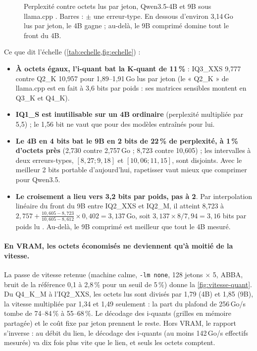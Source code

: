 \begin{figure}[ht]
\centering
\GrapheEchelle
\caption[Perplexité contre octets lus par jeton, Qwen3.5 4B et 9B]{Perplexité contre octets lus par jeton, Qwen3.5-4B et 9B sous llama.cpp \mes. Barres : $\pm$ une erreur-type. En dessous d'environ 3,14\,Go lus par jeton, le 4B gagne ; au-delà, le 9B comprimé domine tout le front du 4B.}
\label{fig:echelle}
\end{figure}

Ce que dit l'échelle (\cref{tab:echelle,fig:echelle}) :
\begin{itemize}
\item \textbf{À octets égaux, l'i-quant bat la K-quant de 11\,\%} : IQ3\_XXS 9,777 contre Q2\_K 10,957 pour 1,89--1,91\,Go lus par jeton (le « Q2\_K » de llama.cpp est en fait à 3,6 bits par poids : ses matrices sensibles montent en Q3\_K et Q4\_K).
\item \textbf{IQ1\_S est inutilisable sur un 4B ordinaire} (perplexité multipliée par 5,5) ; le 1,56 bit ne vaut que pour des modèles entraînés pour lui.
\item \textbf{Le 4B en 4 bits bat le 9B en 2 bits de 22\,\% de perplexité, à 1\,\% d'octets près} (2,730 contre 2,757\,Go ; 8,723 contre 10,605) ; les intervalles à deux erreurs-types, $[8{,}27 ; 9{,}18]$ et $[10{,}06 ; 11{,}15]$, sont disjoints. Avec le meilleur 2 bits portable d'aujourd'hui, rapetisser vaut mieux que comprimer pour Qwen3.5.
\item \textbf{Le croisement a lieu vers 3,2 bits par poids, pas à 2}. Par interpolation linéaire du front du 9B entre IQ2\_XXS et IQ2\_M, il atteint 8,723 à $2{,}757 + \frac{10{,}605 - 8{,}723}{10{,}605 - 8{,}612} \times 0{,}402 = 3{,}137$\,Go, soit $3{,}137 \times 8 / 7{,}94 = 3{,}16$ bits par poids lu \calc. Au-delà, le 9B comprimé est meilleur que tout le 4B mesuré.
\end{itemize}

\paragraph{En VRAM, les octets économisés ne deviennent qu'à moitié de la vitesse.} La passe de vitesse retenue (machine calme, \texttt{-lm none}, 128 jetons $\times$ 5, ABBA, bruit de la référence 0,1 à 2,8\,\% pour un seuil de 5\,\%) donne la \cref{fig:vitesse-quant}. Du Q4\_K\_M à l'IQ2\_XXS, les octets lus sont divisés par 1,79 (4B) et 1,85 (9B), la vitesse multipliée par 1,34 et 1,49 seulement : la part du plafond de 256\,Go/s tombe de 74--84\,\% à 55--68\,\%. Le décodage des i-quants (grilles en mémoire partagée) et le coût fixe par jeton prennent le reste. Hors VRAM, le rapport s'inverse : au débit du lien, le décodage des i-quants (au moins 142\,Go/s effectifs mesurés) va dix fois plus vite que le lien, et seuls les octets comptent.


